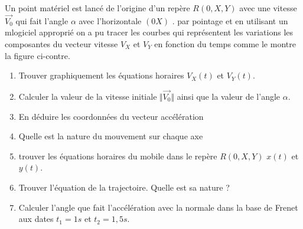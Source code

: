 \documentclass[10pt,a4paper]{article}
\begin{document}
\begin{tcolorbox}[sabour,title=EXERCICE 9]

Un point matériel est lancé de l'origine d'un repère $R(0,X,Y)$ avec une vitesse $\vec{V_0}$ qui fait l'angle $\alpha$ avec l'horizontale $(0X)$ .  par 
pointage et en utilisant un mlogiciel approprié on a pu tracer les courbes qui représentent les variations les composantes du vecteur vitesse $V_X$ et $V_Y$ en fonction du temps comme le montre la figure ci-contre.


\begin{minipage}{10cm}
\begin{enumerate}
\item Trouver graphiquement les équations horaires $V_X(t)$ et $V_Y(t)$.
\item Calculer la valeur de la vitesse initiale $\Vert\vec{V_0}\Vert$ ainsi que la valeur de l'angle $\alpha$.
\item En déduire les coordonnées du vecteur accélération
\item Quelle est la nature du mouvement sur chaque axe 
\item trouver les équations horaires du mobile dans le repère $R(0,X,Y)$ $x(t)$ et $y(t)$.
\item Trouver l'équation de la trajectoire. Quelle est sa nature ?
\item Calculer l'angle que fait l'accélération avec la normale dans la base de Frenet aux dates $t_1=1s$ et $t_2=1,5s$.
\end{enumerate} 
\end{minipage}
\begin{minipage}{8cm}







\end{minipage}
\end{tcolorbox}
\end{document}
